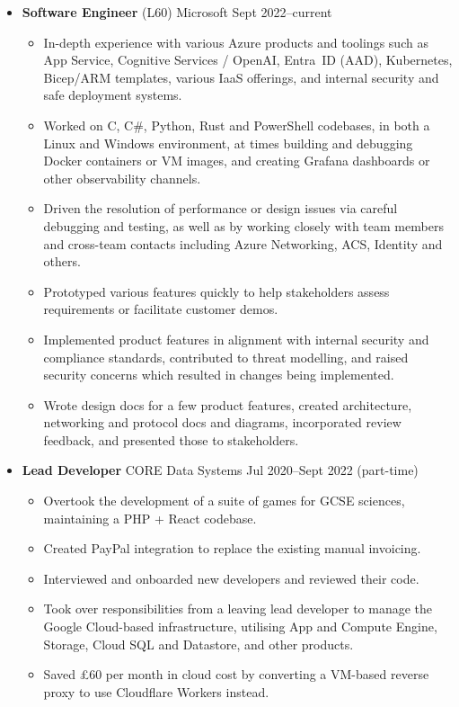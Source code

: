   \begin{itemize}
    \item \textbf{Software Engineer} (L60) \dashdiv{} Microsoft \dashdiv{} Sept 2022--current

    \begin{itemize}
      \item In-depth experience with various Azure products and toolings such as App Service, Cognitive Services / OpenAI, Entra~ID (AAD), Kubernetes, Bicep/ARM templates, various IaaS offerings, and internal security and safe deployment systems.
      \item Worked on C, C\#, Python, Rust and PowerShell codebases, in both a Linux and Windows environment, at times building and debugging Docker containers or VM images, and creating Grafana dashboards or other observability channels.
      \item Driven the resolution of performance or design issues via careful debugging and testing, as well as by working closely with team members and cross-team contacts including Azure Networking, ACS, Identity and others.
      \item Prototyped various features quickly to help stakeholders assess requirements or facilitate customer demos.
      \item Implemented product features in alignment with internal security and compliance standards, contributed to threat modelling, and raised security concerns which resulted in changes being implemented.
      \item Wrote design docs for a few product features, created architecture, networking and protocol docs and diagrams, incorporated review feedback, and presented those to stakeholders.
    \end{itemize}

    \item \textbf{Lead Developer} \dashdiv{} CORE Data Systems \dashdiv{} Jul 2020--Sept 2022 (part-time)

    \begin{itemize}
      \item Overtook the development of a suite of games for GCSE sciences, maintaining a PHP + React codebase.
      \item Created PayPal integration to replace the existing manual invoicing.
      \item Interviewed and onboarded new developers and reviewed their code.
      \item Took over responsibilities from a leaving lead developer to manage the Google Cloud-based infrastructure, utilising App and Compute Engine, Storage, Cloud SQL and Datastore, and other products.
      \item Saved £60 per month in cloud cost by converting a VM-based reverse proxy to use Cloudflare Workers instead.
    \end{itemize}


\end{itemize}
